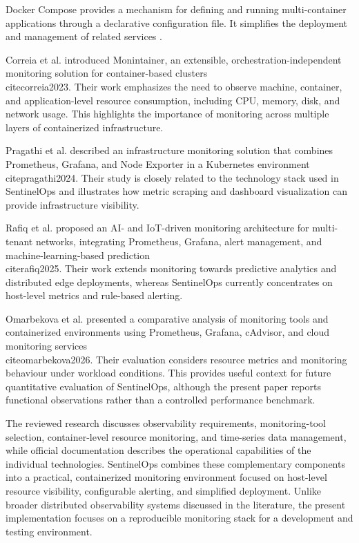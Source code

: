 \documentclass[conference]{IEEEtran}
\begin{document}
Docker Compose provides a mechanism for defining and running
multi-container applications through a declarative
configuration file. It simplifies the deployment and
management of related services \cite{dockercompose}.

Correia et al. introduced Monintainer, an extensible,
orchestration-independent monitoring solution for container-based
clusters \\cite{correia2023}. Their work emphasizes the need to
observe machine, container, and application-level resource
consumption, including CPU, memory, disk, and network usage.
This highlights the importance of monitoring across multiple
layers of containerized infrastructure.

Pragathi et al. described an infrastructure monitoring solution
that combines Prometheus, Grafana, and Node Exporter in a
Kubernetes environment \\cite{pragathi2024}. Their study is
closely related to the technology stack used in SentinelOps
and illustrates how metric scraping and dashboard visualization
can provide infrastructure visibility.

Rafiq et al. proposed an AI- and IoT-driven monitoring
architecture for multi-tenant networks, integrating Prometheus,
Grafana, alert management, and machine-learning-based
prediction \\cite{rafiq2025}. Their work extends monitoring
towards predictive analytics and distributed edge deployments,
whereas SentinelOps currently concentrates on host-level
metrics and rule-based alerting.

Omarbekova et al. presented a comparative analysis of monitoring
tools and containerized environments using Prometheus, Grafana,
cAdvisor, and cloud monitoring services \\cite{omarbekova2026}.
Their evaluation considers resource metrics and monitoring
behaviour under workload conditions. This provides useful
context for future quantitative evaluation of SentinelOps,
although the present paper reports functional observations
rather than a controlled performance benchmark.

The reviewed research discusses observability requirements,
monitoring-tool selection, container-level resource monitoring,
and time-series data management, while official documentation
describes the operational capabilities of the individual
technologies. SentinelOps combines these complementary
components into a practical, containerized monitoring
environment focused on host-level resource visibility,
configurable alerting, and simplified deployment. Unlike
broader distributed observability systems discussed in the
literature, the present implementation focuses on a
reproducible monitoring stack for a development and testing
environment.
\end{document}

